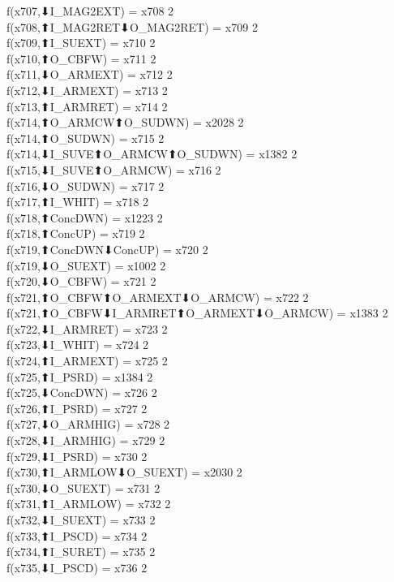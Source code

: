 f(x707,⬇I_MAG2EXT) = x708 {2} \\
f(x708,⬆I_MAG2RET⬇O_MAG2RET) = x709 {2} \\
f(x709,⬆I_SUEXT) = x710 {2} \\
f(x710,⬆O_CBFW) = x711 {2} \\
f(x711,⬇O_ARMEXT) = x712 {2} \\
f(x712,⬇I_ARMEXT) = x713 {2} \\
f(x713,⬆I_ARMRET) = x714 {2} \\
f(x714,⬆O_ARMCW⬆O_SUDWN) = x2028 {2} \\
f(x714,⬆O_SUDWN) = x715 {2} \\
f(x714,⬇I_SUVE⬆O_ARMCW⬆O_SUDWN) = x1382 {2} \\
f(x715,⬇I_SUVE⬆O_ARMCW) = x716 {2} \\
f(x716,⬇O_SUDWN) = x717 {2} \\
f(x717,⬆I_WHIT) = x718 {2} \\
f(x718,⬆ConcDWN) = x1223 {2} \\
f(x718,⬆ConcUP) = x719 {2} \\
f(x719,⬆ConcDWN⬇ConcUP) = x720 {2} \\
f(x719,⬇O_SUEXT) = x1002 {2} \\
f(x720,⬇O_CBFW) = x721 {2} \\
f(x721,⬆O_CBFW⬆O_ARMEXT⬇O_ARMCW) = x722 {2} \\
f(x721,⬆O_CBFW⬇I_ARMRET⬆O_ARMEXT⬇O_ARMCW) = x1383 {2} \\
f(x722,⬇I_ARMRET) = x723 {2} \\
f(x723,⬇I_WHIT) = x724 {2} \\
f(x724,⬆I_ARMEXT) = x725 {2} \\
f(x725,⬆I_PSRD) = x1384 {2} \\
f(x725,⬇ConcDWN) = x726 {2} \\
f(x726,⬆I_PSRD) = x727 {2} \\
f(x727,⬇O_ARMHIG) = x728 {2} \\
f(x728,⬇I_ARMHIG) = x729 {2} \\
f(x729,⬇I_PSRD) = x730 {2} \\
f(x730,⬆I_ARMLOW⬇O_SUEXT) = x2030 {2} \\
f(x730,⬇O_SUEXT) = x731 {2} \\
f(x731,⬆I_ARMLOW) = x732 {2} \\
f(x732,⬇I_SUEXT) = x733 {2} \\
f(x733,⬆I_PSCD) = x734 {2} \\
f(x734,⬆I_SURET) = x735 {2} \\
f(x735,⬇I_PSCD) = x736 {2} \\
